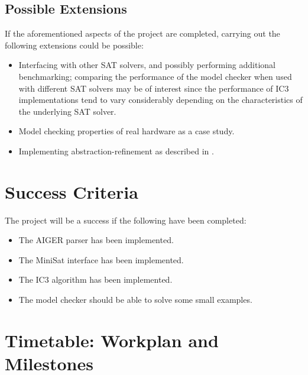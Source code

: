\documentclass[12pt,a4paper,twoside]{article}
\begin{document}
\subsection*{Possible Extensions}
If the aforementioned aspects of the project are completed, carrying out
the following extensions could be possible:
\begin{itemize}
\item Interfacing with other SAT solvers, and possibly performing additional
benchmarking; comparing the performance of the model checker when used with
different SAT solvers may be of interest since the performance
of IC3 implementations tend to vary considerably depending on the
characteristics of the underlying SAT solver.
\item Model checking properties of real hardware as a case study.
\item Implementing abstraction-refinement as described in \cite{vizel12}.
\end{itemize}


\section*{Success Criteria}

The project will be a success if the following have been completed:
\begin{itemize}
\item The AIGER parser has been implemented.
\item The MiniSat interface has been implemented.
\item The IC3 algorithm has been implemented.
\item The model checker should be able to solve some small examples.
\end{itemize}


\section*{Timetable: Workplan and Milestones}
\end{document}
